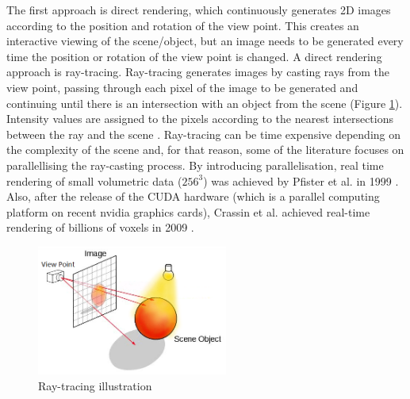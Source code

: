 \documentclass{subfiles}
\begin{document}
\par{ \color{blue} The first approach is direct rendering, which continuously generates 2D images according to the position and rotation of the view point. This creates an interactive viewing of the scene/object, but an image needs to be generated every time the position or rotation of the view point is changed. A direct rendering approach is ray-tracing. Ray-tracing generates images by casting rays from the view point, passing through each pixel of the image to be generated and continuing until there is an intersection with an object from the scene (Figure \ref{fig:Raytracing}). Intensity values are assigned to the pixels according to the nearest intersections between the ray and the scene \cite{Hanrahan1983}.} Ray-tracing can be time expensive depending on the complexity of the scene and, for that reason, some of the literature focuses on parallellising the ray-casting process. By introducing parallelisation, real time rendering of small volumetric data ($256^3$) was achieved by Pfister et al. in 1999 \cite{Pfister1999}. Also, after the release of the CUDA hardware \cite{Nickolls2008} (which is a parallel computing platform on recent nvidia graphics cards), Crassin et al. achieved real-time rendering of billions of voxels in 2009 \cite{Crassin2009}. 
	
	 \begin{figure} [h!]
	 	\centering
	 	\includegraphics[width=0.56\textwidth]{img/RayTracing}
	 	\caption{Ray-tracing illustration}
	 	\label{fig:Raytracing}
	 \end{figure}
	 
\end{document}
